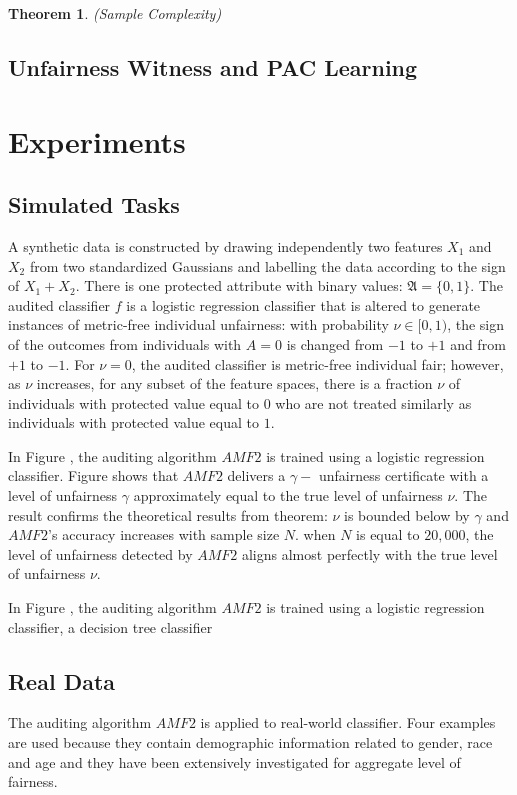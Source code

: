 \documentclass{article}
\newtheorem{thm}{Theorem}[section]
\begin{document}
\begin{thm}
(Sample Complexity)
\end{thm}

\subsection{Unfairness Witness and PAC Learning}
\section{Experiments}

\subsection{Simulated Tasks}
A synthetic data is constructed by drawing independently two features $X_{1}$ and $X_{2}$ from two standardized Gaussians and labelling the data according to the sign of $X_{1} + X_{2}$.   There is one protected attribute with binary values: $\mathfrak{A}=\{0, 1\}$. The audited classifier $f$ is a logistic regression classifier that is altered to generate instances of metric-free individual unfairness: with probability $\nu\in[0, 1)$, the sign of the outcomes from individuals with $A=0$ is changed from $-1$ to $+1$ and from $+1$ to $-1$. For $\nu=0$, the audited classifier is metric-free individual fair; however, as $\nu$ increases, for any subset of the feature spaces, there is a fraction  $\nu$ of individuals with protected value equal to $0$ who are not treated similarly as individuals with protected value equal to $1$. 

In Figure , the auditing algorithm $AMF2$ is trained using a logistic regression classifier. Figure shows that $AMF2$ delivers a $\gamma-$ unfairness certificate with a level of unfairness $\gamma$ approximately equal to the true level of unfairness $\nu$. The result confirms the theoretical results from theorem: $\nu$ is bounded below by $\gamma$ and $AMF2$'s accuracy increases with sample size $N$. when $N$ is equal to $20,000$, the level of unfairness detected by $AMF2$ aligns almost perfectly with the true level of unfairness $\nu$.  

In Figure , the auditing algorithm $AMF2$ is trained using a logistic regression  classifier, a decision tree classifier 

\subsection{Real Data}
The auditing algorithm $AMF2$ is applied to real-world classifier. Four examples are used because they contain demographic information related to gender, race and age and they have been extensively investigated for aggregate level of fairness.
\end{document}
